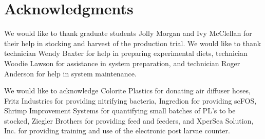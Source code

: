 \documentclass[useAMS,usenatbib]{tellus}
\begin{document}
\section{Acknowledgments}
\noindent We would like to thank graduate students Jolly Morgan and Ivy McClellan for their help in stocking and harvest of the production trial. We would like to thank technician Wendy Baxter for help in preparing experimental diets, technician Woodie Lawson for assistance in system preparation, and technician Roger Anderson for help in system maintenance.

We would like to acknowledge Colorite Plastics for donating air diffuser hoses, Fritz Industries for providing nitrifying bacteria, Ingredion for providing scFOS, Shrimp Improvement Systems for quantifying small batches of PL's to be stocked, Ziegler Brothers for providing feed and feeders, and XperSea Solution, Inc. for providing training and use of the electronic post larvae counter.
\end{document}
